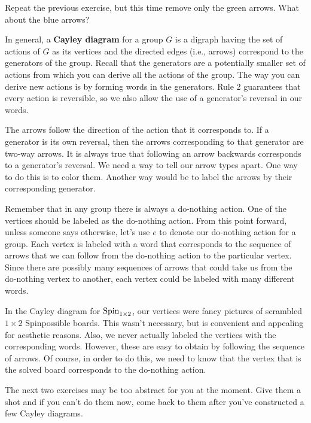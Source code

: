 \begin{exercise}\label{exer:minimal_Cayley_Spin1by2}
Repeat the previous exercise, but this time remove only the green arrows.  What about the blue arrows?
\end{exercise}

In general, a \textbf{Cayley diagram} for a group \(G\) is a digraph having the set of actions of \(G\) as its vertices and the directed edges (i.e., arrows) correspond to the generators of the group.  Recall that the generators are a potentially smaller set of actions from which you can derive all the actions of the group.  The way you can derive new actions is by forming words in the generators.  Rule 2 guarantees that every action is reversible, so we also allow the use of a generator's reversal in our words.  

The arrows follow the direction of the action that it corresponds to. If a generator is its own reversal, then the arrows corresponding to that generator are two-way arrows.  It is always true that following an arrow backwards corresponds to a generator's reversal.  We need a way to tell our arrow types apart.  One way to do this is to color them.  Another way would be to label the arrows by their corresponding generator.

Remember that in any group there is always a do-nothing action.  One of the vertices should be labeled as the do-nothing action.  From this point forward, unless someone says otherwise, let's use \(e\) to denote our do-nothing action for a group.  Each vertex is labeled with a word that corresponds to the sequence of arrows that we can follow from the do-nothing action to the particular vertex.  Since there are possibly many sequences of arrows that could take us from the do-nothing vertex to another, each vertex could be labeled with many different words.

In the Cayley diagram for \(\operatorname{Spin}_{1\times 2}\), our vertices were fancy pictures of scrambled \(1\times 2\) Spinpossible boards.  This wasn't necessary, but is convenient and appealing for aesthetic reasons.  Also, we never actually labeled the vertices with the corresponding words.  However, these are easy to obtain by following the sequence of arrows.  Of course, in order to do this, we need to know that the vertex that is the solved board corresponds to the do-nothing action.

The next two exercises may be too abstract for you at the moment.  Give them a shot and if you can't do them now, come back to them after you've constructed a few Cayley diagrams.

